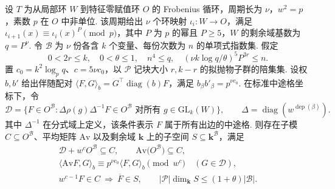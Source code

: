 \begin{lemma}[边同余条件与约化空间]
\label{lem:a-edge-condition}
\emitthmsource
设 $T$ 为从局部环 $W$ 到特征零赋值环 $O$ 的 Frobenius 循环，周期长为 $\nu$，$w^2=p$，素数 $p$ 在 $O$ 中非单位. 该周期给出 $\nu$ 个环映射 $\iota_i:W\to O$，满足 $\iota_{i+1}(x)\equiv\iota_i(x)^P\pmod p$，其中 $P$ 为 $p$ 的幂且 $P\ge5$，$W$ 的剩余域基数为 $q=P^\nu$. 令 $\mathcal B$ 为 $\nu$ 份各含 $k$ 个变量、每份次数为 $n$ 的单项式指数集. 假定
\[
 0<2r\le k,\quad 0<\theta\le1,\quad n^4\le q,\quad
 (\nu k\log q/\theta)^5 P^{3r}\le n .
\]
置 $c_0=k^2\log_p q$、$c=5\nu c_0$，以 $\mathcal P$ 记块大小 $r,k-r$ 的拟抛物子群的陪集集. 设权 $b,b'$ 给出伴随配对
\(\langle F,G\rangle_b=G^\top\operatorname{diag}(b)F\)，满足 $b_\beta b'_\beta=p^{\nu c_0}$. 在标准中途格坐标下，令
\[
 \mathcal D=\{F\in O^{\mathcal B}:
       \Delta\rho(g)\Delta^{-1}F\in O^{\mathcal B}
            \text{ 对所有 }g\in\mathrm{GL}_k(W)\},
 \qquad
 \Delta=\operatorname{diag}(w^{\operatorname{dep}(\beta)}).
\]
其中 $\Delta^{-1}$ 在分式域上定义，该条件表示 $F$ 属于所有出边的中途格. 则存在子模 $C\subseteq O^{\mathcal B}$、平均矩阵 $\mathrm{Av}$ 以及剩余域 $\mathbf k$ 上的子空间 $S\subseteq\mathbf k^{\mathcal B}$，满足
\[
 \begin{gathered}
 \mathcal D+w^cO^{\mathcal B}\subseteq C,\qquad
 \mathrm{Av}\bigl(O^{\mathcal B}\bigr)\subseteq C,\\
 \langle \mathrm{Av}F,G\rangle_b
     \equiv p^{\nu c_0}\langle F,G\rangle_b \pmod{w^c}
          \quad (G\in\mathcal D),\\
 w^{c-1}F\in C\ \Longrightarrow\ \overline F\in S,\qquad
 |\mathcal P|\dim_\mathbf k S\le (1+\theta)|\mathcal B|.
 \end{gathered}
\]
\end{lemma}
